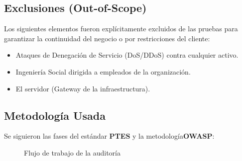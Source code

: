 \documentclass[a4paper]{article}
\begin{document}
\subsection{Exclusiones (Out-of-Scope)}
Los siguientes elementos fueron explícitamente excluidos de las pruebas para garantizar la continuidad del negocio o por restricciones del cliente:

\begin{itemize}
    \item Ataques de Denegación de Servicio (DoS/DDoS) contra cualquier activo.
    \item Ingeniería Social dirigida a empleados de la organización.
    \item El servidor  (Gateway de la infraestructura).
\end{itemize}

\subsection{Metodología Usada}
Se siguieron las fases del estándar \textbf{PTES} y la metodología\textbf{OWASP}:

\vspace{0.3cm}
\begin{figure}[H]
    \centering
    \caption{Flujo de trabajo de la auditoría}
\end{figure}
\end{document}
